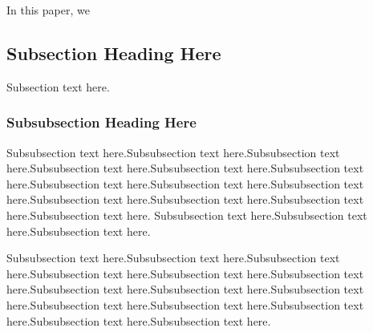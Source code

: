 \documentclass[10pt,journal,cspaper,compsoc]{IEEEtran}
\begin{document}
In this paper, we  


\subsection{Subsection Heading Here}
Subsection text here.


\subsubsection{Subsubsection Heading Here}
Subsubsection text here.Subsubsection text here.Subsubsection text here.Subsubsection text here.Subsubsection text here.Subsubsection text here.Subsubsection text here.Subsubsection text here.Subsubsection text here.Subsubsection text here.Subsubsection text here.Subsubsection text here.Subsubsection text here.
Subsubsection text here.Subsubsection text here.Subsubsection text here.

Subsubsection text here.Subsubsection text here.Subsubsection text here.Subsubsection text here.Subsubsection text here.Subsubsection text here.Subsubsection text here.Subsubsection text here.Subsubsection text here.Subsubsection text here.Subsubsection text here.Subsubsection text here.Subsubsection text here.Subsubsection text here.


%
%

\end{document}
